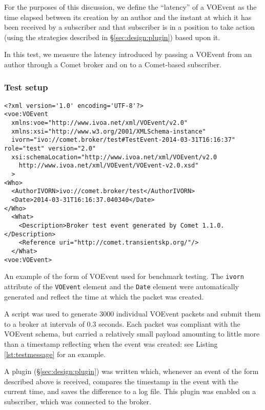 \documentclass[5p,authoryear]{elsarticle}
\begin{document}
For the purposes of this discussion, we define the ``latency'' of a VOEvent as
the time elapsed between its creation by an author and the instant at which it
has been received by a subscriber and that subscriber is in a position to take
action (using the strategies described in \S\ref{sec:design:plugin}) based
upon it.

In this test, we measure the latency introduced by passing a VOEvent from an
author through a Comet broker and on to a Comet-based subscriber.

\subsubsection{Test setup}
\label{sec:perf:latency:setup}

\begin{listing*}
\begin{verbatim}
<?xml version='1.0' encoding='UTF-8'?>
<voe:VOEvent
  xmlns:voe="http://www.ivoa.net/xml/VOEvent/v2.0"
  xmlns:xsi="http://www.w3.org/2001/XMLSchema-instance"
  ivorn="ivo://comet.broker/test#TestEvent-2014-03-31T16:16:37" role="test" version="2.0"
  xsi:schemaLocation="http://www.ivoa.net/xml/VOEvent/v2.0
    http://www.ivoa.net/xml/VOEvent/VOEvent-v2.0.xsd"
  >
<Who>
  <AuthorIVORN>ivo://comet.broker/test</AuthorIVORN>
  <Date>2014-03-31T16:16:37.040340</Date>
</Who>
  <What>
    <Description>Broker test event generated by Comet 1.1.0.</Description>
    <Reference uri="http://comet.transientskp.org/"/>
  </What>
<voe:VOEvent>
\end{verbatim}
\caption{An example of the form of VOEvent used for benchmark testing. The
\texttt{ivorn} attribute of the \texttt{VOEvent} element and the \texttt{Date}
element were automatically generated and reflect the time at which the packet
was created.}
\label{lst:testmessage}
\end{listing*}

A script was used to generate 3000 individual VOEvent packets and submit them
to a broker at intervals of 0.3 seconds.  Each packet was compliant with the
VOEvent schema, but carried a relatively small payload amounting to little
more than a timestamp reflecting when the event was created: see Listing
\ref{lst:testmessage} for an example.

A plugin (\S\ref{sec:design:plugin}) was written which, whenever an event of
the form described above is received, compares the timestamp in the event with
the current time, and saves the difference to a log file. This plugin was
enabled on a subscriber, which was connected to the broker.
\end{document}
